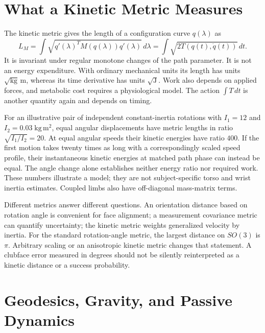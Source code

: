 \documentclass[12pt, openany]{book}
\theoremstyle{plain}
\begin{document}
\section{What a Kinetic Metric Measures}

The kinetic metric gives the length of a configuration curve $q(\lambda)$ as
\begin{equation}\label{eq:manifold_metric_length}
 L_M=\int\sqrt{q'(\lambda)^TM(q(\lambda))q'(\lambda)}\,d\lambda
     =\int\sqrt{2T(q(t),\dot q(t))}\,dt.
\end{equation}
It is invariant under regular monotone changes of the path parameter. It is
not an energy expenditure. With ordinary mechanical units its length has
units $\sqrt{\mathrm{kg}}\,\mathrm m$, whereas its time derivative has units
$\sqrt{\mathrm J}$. Work also depends on applied forces, and metabolic cost
requires a physiological model. The action $\int T\,dt$ is another quantity
again and depends on timing.

For an illustrative pair of independent constant-inertia rotations with
$I_1=12$ and $I_2=0.03\;\mathrm{kg\,m^2}$, equal angular displacements have
metric lengths in ratio $\sqrt{I_1/I_2}=20$. At equal angular speeds their
kinetic energies have ratio $400$. If the first motion takes twenty times
as long with a correspondingly scaled speed profile, their instantaneous
kinetic energies at matched path phase can instead be equal. The angle
change alone establishes neither energy ratio nor required work. These
numbers illustrate a model; they are not subject-specific torso and wrist
inertia estimates. Coupled limbs also have off-diagonal mass-matrix terms.

Different metrics answer different questions. An orientation distance based
on rotation angle is convenient for face alignment; a measurement covariance
metric can quantify uncertainty; the kinetic metric weights generalized
velocity by inertia. For the standard rotation-angle metric, the largest
distance on $SO(3)$ is $\pi$. Arbitrary scaling or an anisotropic kinetic
metric changes that statement. A clubface error measured in degrees should
not be silently reinterpreted as a kinetic distance or a success probability.

\section{Geodesics, Gravity, and Passive Dynamics}
\end{document}
